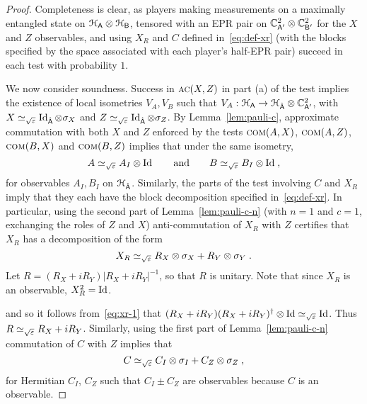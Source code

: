 \begin{proof}
Completeness is clear, as players making measurements on a maximally entangled state on $\mathcal{H}_{{\textsf{A}}}\otimes \mathcal{H}_{{\textsf{B}}}$, tensored with an EPR pair on $\mathbb{C}^2_{{\textsf{A}}'} \otimes \mathbb{C}^2_{{\textsf{B}}'}$ for the $X$ and $Z$ observables, and using $X_R$ and $C$ defined in~\eqref{eq:def-xr} (with the blocks specified by the space associated with each player's half-EPR pair) succeed in each test with probability $1$. 

We now consider soundness. Success in $\textsc{ac}(X,Z)$ in part (a) of the test implies the existence of local isometries $V_A,V_B$ such that $V_A:\mathcal{H}_{\textsf{A}}\to \mathcal{H}_{\hat{{\textsf{A}}}}\otimes \mathbb{C}^2_{{\textsf{A}}'}$, with $X\simeq_{\sqrt{\varepsilon}} \mathop{\rm Id}\nolimits_{\hat{{\textsf{A}}}}\otimes \sigma_X$ and $Z\simeq_{\sqrt{\varepsilon}} \mathop{\rm Id}\nolimits_{\hat{{\textsf{A}}}}\otimes\sigma_Z$. By Lemma~\ref{lem:pauli-c}, approximate commutation with both $X$ and $Z$ enforced by the tests $\textsc{com}(A,X)$, $\textsc{com}(A,Z)$, $\textsc{com}(B,X)$ and $\textsc{com}(B,Z)$ implies that under the same isometry, 
\begin{equation}\label{eq:cliff-2c}
A\simeq_{\sqrt{\varepsilon}} A_I \otimes \mathop{\rm Id}\nolimits\qquad\text{and}\qquad B\simeq_{\sqrt{\varepsilon}} B_I \otimes \mathop{\rm Id}\nolimits\;,
\end{equation}
 for observables $A_I, B_I$ on $\mathcal{H}_{\hat{{\textsf{A}}}}$. Similarly, the parts of the test involving $C$ and $X_R$ imply that they each have the block decomposition specified in~\eqref{eq:def-xr}. 
In particular, using the second part of Lemma~\ref{lem:pauli-c-n} (with $n=1$ and $c=1$, exchanging the roles of $Z$ and $X$) anti-commutation of $X_R$ with $Z$ certifies that $X_R$ has  a decomposition of the form  
\begin{equation}\label{eq:xr-1}
X_R \simeq_{\sqrt{\varepsilon}} R_X \otimes \sigma_X + R_Y \otimes \sigma_Y\;.
\end{equation}
Let $R = ( R_X + i R_Y)| R_X + i R_Y|^{-1}$, so that $R$ is unitary. Note that since $X_R$ is an observable, $X_R^2=\mathop{\rm Id}\nolimits$. 


 and so it follows from~\eqref{eq:xr-1} that $(R_X+iR_Y)(R_X+iR_Y)^\dagger \otimes \mathop{\rm Id}\nolimits \simeq_{\sqrt{\varepsilon}} \mathop{\rm Id}\nolimits$. Thus $R \simeq_{\sqrt{\varepsilon}} R_X + i R_Y$. 
 Similarly, using the first part of Lemma~\ref{lem:pauli-c-n} commutation of $C$ with $Z$ implies that 
\begin{equation}\label{clif-2ab}
C \simeq_{\sqrt{\varepsilon}} C_I \otimes \sigma_I + C_Z \otimes \sigma_Z\;,
\end{equation}
 for Hermitian $C_I$, $C_Z$ such that $C_I \pm C_Z$ are observables because $C$ is an observable. 


\end{proof}
